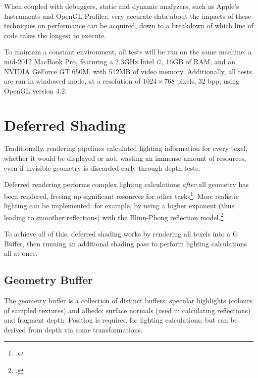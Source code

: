 \documentclass[11pt, oneside]{report}
\begin{document}
When coupled with debuggers, static and dynamic analyzers, such as Apple's Instruments and \gls{OpenGL} Profiler, very accurate data about the impacts of these techniques on performance can be acquired, down to a breakdown of which line of code takes the longest to execute.

To maintain a constant environment, all tests will be run on the same machine: a mid-2012 MacBook Pro, featuring a 2.3GHz Intel i7, 16GB of RAM, and an NVIDIA GeForce GT 650M, with 512MB of video memory. Additionally, all tests are ran in windowed mode, at a resolution of $1024 \times 768$ pixels, 32 \gls{bpp}, using \gls{OpenGL} version 4.2.

\chapter{Deferred Shading}
Traditionally, rendering pipelines calculated lighting information for every \gls{texel}, whether it would be displayed or not, wasting an immense amount of resources, even if invisible geometry is discarded early through \glspl{depth test}.

Deferred rendering performs complex lighting calculations \textit{after} all geometry has been rendered, freeing up significant resources for other tasks\footcite{gpupro-deferred}. More realistic lighting can be implemented: for example, by using a higher exponent (thus leading to smoother reflections) with the \gls{Blinn-Phong reflection model}.\footcite{ferko-deferred}

To achieve all of this, deferred shading works by rendering all texels into a \gls{G Buffer}, then running an additional shading pass to perform lighting calculations all at once.

\section{Geometry Buffer}
The geometry buffer is a collection of distinct buffers: \gls{specular} highlights (colours of sampled textures) and albedo; surface normals (used in calculating reflections) and fragment depth. Position is required for lighting calculations, but can be derived from depth via some transformations.
\end{document}
